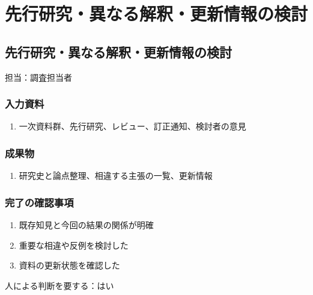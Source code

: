 \documentclass[a4paper,11pt]{article}
\begin{document}
\section{先行研究・異なる解釈・更新情報の検討}
\subsection{先行研究・異なる解釈・更新情報の検討}
\par 担当：調査担当者\par\medskip
\subsubsection*{入力資料}
\begin{enumerate}[leftmargin=2em,itemsep=0.35em]
\item 一次資料群、先行研究、レビュー、訂正通知、検討者の意見
\end{enumerate}
\subsubsection*{成果物}
\begin{enumerate}[leftmargin=2em,itemsep=0.35em]
\item 研究史と論点整理、相違する主張の一覧、更新情報
\end{enumerate}
\subsubsection*{完了の確認事項}
\begin{enumerate}[leftmargin=2em,itemsep=0.35em]
\item 既存知見と今回の結果の関係が明確
\item 重要な相違や反例を検討した
\item 資料の更新状態を確認した
\end{enumerate}
\par 人による判断を要する：はい\par\medskip
\end{document}
